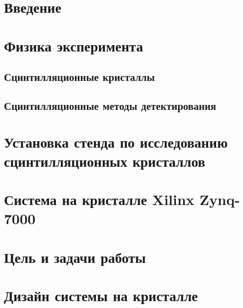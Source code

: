 \documentclass[a4paper, 14pt]{extarticle}
\begin{document}


\tableofcontents
\newpage

\section*{Введение}
    
    \newpage

\section{Физика эксперимента}
    
    \subsection{Сцинтилляционные кристаллы}
    
    \subsection{Сцинтилляционные методы детектирования}
    
    \newpage

\section{Установка стенда по исследованию сцинтилляционных кристаллов}
    
%    
    \newpage

\section{Система на кристалле Xilinx Zynq-7000}
    
    \newpage
    
\section{Цель и задачи работы}
    
    \newpage
    
\section{Дизайн системы на кристалле}
    
\end{document}
